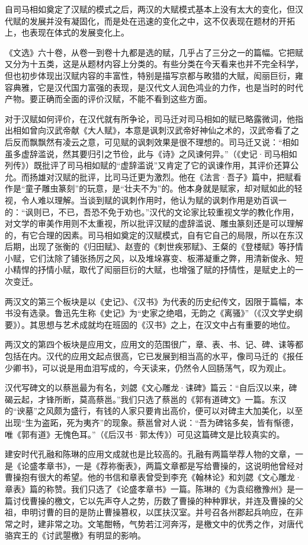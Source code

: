 自司马相如奠定了汉赋的模式之后，两汉的大赋模式基本上没有太大的变化，但汉代赋的发展并没有凝固化，而是处在迅速的变化之中，这不仅表现在题材的开拓上，也表现在体式的发展变化上。

《文选》六十卷，从卷一到卷十九都是选的赋，几乎占了三分之一的篇幅。它把赋又分为十五类，这是从题材内容上分类的。有些分类在今天看来也并不完全科学，但也初步体现出汉赋内容的丰富性，特别是描写京都与畋猎的大赋，闳丽巨衍，雍容典雅，它是汉代国力富强的表现，是汉代文人润色鸿业的力作，也是当时的时代产物。要正确而全面的评价汉赋，不能不看到这些方面。

对于汉赋如何评价，在汉代就有所争论，司马迁对司马相如的赋已略露微词，他指出相如曾向汉武帝献《大人赋》，本意是讽刺汉武帝好神仙之术的，汉武帝看了之后反而飘飘然有凌云之意，可见赋的讽刺效果是很不理想的。司马迁又说：“相如虽多虚辞滥说，然其要归引之节俭，此与《诗》之风谏何异。”（《史记·司马相如列传》）既批评了司马相如赋的“虚辞滥说”又肯定了它的讽谏作用，其评价还算公允。而扬雄对汉赋的批评，比司马迁更为激烈。他在《法言·吾子》篇中，把赋看作是“童子雕虫篆刻”的玩意，是“壮夫不为”的。他本身就是赋家，却对赋如此的轻视，令人难以理解。当谈到赋的讽刺作用时，他认为赋的讽刺作用是劝百讽一的：“讽则已，不已，吾恐不免于劝也。”汉代的文论家比较重视文学的教化作用，对文学的审美作用则不太重视，所以批评汉赋的虚辞滥说、雕虫篆刻还是可以理解的，有它合理的因素。司马相如奠定的汉赋模式，自有它自己的局限，所以在东汉后期，出现了张衡的《归田赋》、赵壹的《刺世疾邪赋》、王粲的《登楼赋》等抒情小赋，它们汰除了铺张扬厉之风，以及堆垛寡变、板滞凝重之弊，用清新俊永、短小精悍的抒情小赋，取代了闳丽巨衍的大赋，也增强了赋的抒情性，是赋史上的一次变迁。

两汉文的第三个板块是以《史记》、《汉书》为代表的历史纪传文，因限于篇幅，本书没有选录。鲁迅先生称《史记》为“史家之绝唱，无韵之《离骚》”（《汉文学史纲要》）。其思想与艺术成就均在班固的《汉书》之上，在汉文中占有重要的地位。

两汉文的第四个板块是应用文，应用文的范围很广，章、表、书、记、碑、诔等都包括在内。汉代的应用文起点很高，它已发展到相当高的水平，像司马迁的《报任少卿书》，可以说是用血泪写成的，今天读来，仍然令人回肠荡气，叹为观止。

汉代写碑文的以蔡邕最为有名，刘勰《文心雕龙·诔碑》篇云：“自后汉以来，碑碣云起，才锋所断，莫高蔡邕。”我们只选了蔡邕的《郭有道碑文》一篇。东汉的“谀墓”之风颇为盛行，有钱的人家只要肯出高价，便可以对碑主大加美化，以至出现“生为盗跖，死为夷齐”的现象。蔡邕曾对人说：“吾为碑铭多矣，皆有惭德，唯《郭有道》无愧色耳。”（《后汉书·郭太传》）可见这篇碑文是比较真实的。

建安时代孔融和陈琳的应用文成就也是比较高的。孔融有两篇举荐人物的文章，一是《论盛孝章书》，一是《荐祢衡表》，两篇文章都是写给曹操的，这说明他曾经对曹操抱有很大的希望。他的书信和章表曾受到李充《翰林论》和刘勰《文心雕龙·章表》篇的称赞。我们只选了《论盛孝章书》一篇。陈琳的《为袁绍檄豫州》是一篇讨伐曹操的檄文，它以先声夺人之势，历数了曹操的种种罪状，并连及曹操的父祖，申明讨曹的目的是防止曹操篡权，以匡扶汉室。并号召各州郡起兵响应，在非常之时，建非常之功。文笔酣畅，气势若江河奔泻，是檄文中的优秀之作，对唐代骆宾王的《讨武曌檄》有明显的影响。

